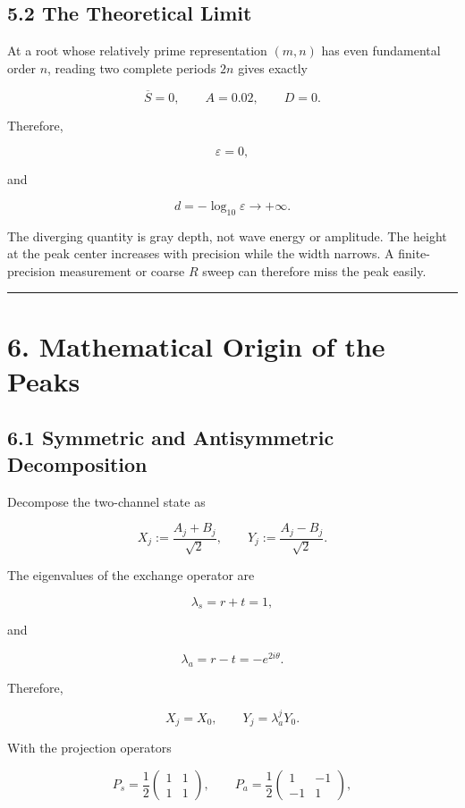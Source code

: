 \documentclass[
  10pt,
  a4paper,
]{article}
\begin{document}
\subsection{5.2 The Theoretical Limit}\label{the-theoretical-limit}

At a root whose relatively prime representation \((m,n)\) has even
fundamental order \(n\), reading two complete periods \(2n\) gives
exactly

\[
\overline S=0,
\qquad
A=0.02,
\qquad
D=0.
\]

Therefore,

\[
\varepsilon=0,
\]

and

\[
d=-\log_{10}\varepsilon
\longrightarrow+\infty.
\]

The diverging quantity is gray depth, not wave energy or amplitude. The
height at the peak center increases with precision while the width
narrows. A finite-precision measurement or coarse \(R\) sweep can
therefore miss the peak easily.

\begin{center}\rule{0.5\linewidth}{0.5pt}\end{center}

\section{6. Mathematical Origin of the
Peaks}\label{mathematical-origin-of-the-peaks}

\subsection{6.1 Symmetric and Antisymmetric
Decomposition}\label{symmetric-and-antisymmetric-decomposition}

Decompose the two-channel state as

\[
X_j:=\frac{A_j+B_j}{\sqrt2},
\qquad
Y_j:=\frac{A_j-B_j}{\sqrt2}.
\]

The eigenvalues of the exchange operator are

\[
\lambda_s=r+t=1,
\]

and

\[
\lambda_a=r-t=-e^{2i\theta}.
\]

Therefore,

\[
X_j=X_0,
\qquad
Y_j=\lambda_a^jY_0.
\]

With the projection operators

\[
P_s=\frac12
\begin{pmatrix}
1&1\\1&1
\end{pmatrix},
\qquad
P_a=\frac12
\begin{pmatrix}
1&-1\\-1&1
\end{pmatrix},
\]
\end{document}
